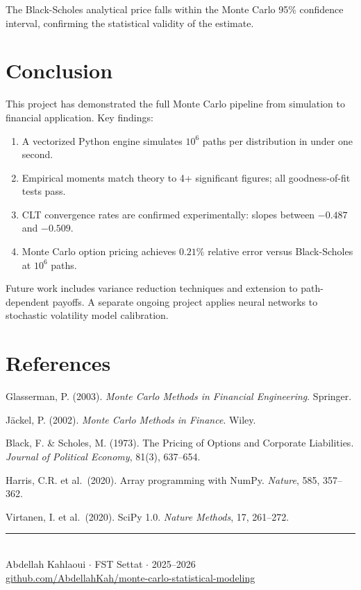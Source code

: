 \documentclass[12pt,a4paper]{article}
\begin{document}
The Black-Scholes analytical price falls within the Monte Carlo 95\% confidence interval,
confirming the statistical validity of the estimate.

\section{Conclusion}

This project has demonstrated the full Monte Carlo pipeline from simulation to financial
application. Key findings:
\begin{enumerate}[noitemsep]
  \item A vectorized Python engine simulates $10^6$ paths per distribution in under one second.
  \item Empirical moments match theory to 4+ significant figures; all goodness-of-fit tests pass.
  \item CLT convergence rates are confirmed experimentally: slopes between $-0.487$ and $-0.509$.
  \item Monte Carlo option pricing achieves $0.21\%$ relative error versus Black-Scholes at $10^6$ paths.
\end{enumerate}
Future work includes variance reduction techniques and extension to path-dependent payoffs.
A separate ongoing project applies neural networks to stochastic volatility model calibration.

\section*{References}
\begin{enumerate}[label={[\arabic*]},noitemsep]
  \item Glasserman, P. (2003). \textit{Monte Carlo Methods in Financial Engineering}. Springer.
  \item Jäckel, P. (2002). \textit{Monte Carlo Methods in Finance}. Wiley.
  \item Black, F. \& Scholes, M. (1973). The Pricing of Options and Corporate Liabilities.
        \textit{Journal of Political Economy}, 81(3), 637--654.
  \item Harris, C.R. et al.\ (2020). Array programming with NumPy. \textit{Nature}, 585, 357--362.
  \item Virtanen, I. et al.\ (2020). SciPy 1.0. \textit{Nature Methods}, 17, 261--272.
\end{enumerate}

\vfill
\begin{center}
  \color{gray}\small\rule{0.4\linewidth}{0.4pt}\\[4pt]
  Abdellah Kahlaoui $\cdot$ FST Settat $\cdot$ 2025--2026\\
  \href{https://github.com/AbdellahKah/monte-carlo-statistical-modeling}{github.com/AbdellahKah/monte-carlo-statistical-modeling}
\end{center}
\end{document}
